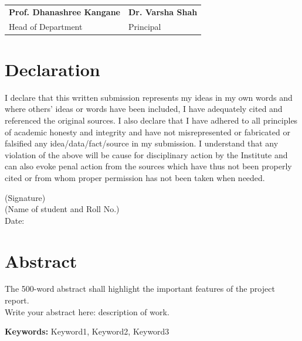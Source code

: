 \documentclass[12pt,a4paper,twoside,openright]{report}
\begin{document}
	\vspace{0.8cm}
	\begin{center}
		\begin{tabular}{p{} p{}}
			\textbf{Prof. Dhanashree Kangane} &
			\textbf{Dr. Varsha Shah} \\
			Head of Department & Principal
		\end{tabular}
	\end{center}
	\vspace*{\fill}
	\clearpage
	
	\chapter*{Declaration}
	I declare that this written submission represents my ideas in my own words and where others' ideas or words have been included, I have adequately cited and referenced the original sources. I also declare that I have adhered to all principles of academic honesty and integrity and have not misrepresented or fabricated or falsified any idea/data/fact/source in my submission. I understand that any violation of the above will be cause for disciplinary action by the Institute and can also evoke penal action from the sources which have thus not been properly cited or from whom proper permission has not been taken when needed.
	
	\vspace{1cm}
	\begin{flushright}
		(Signature) \\[0.5cm]
		(Name of student and Roll No.) \\
		Date:
	\end{flushright}
	
	\chapter*{Abstract}
	The 500-word abstract shall highlight the important features of the project report. \\
	Write your abstract here: description of work.
	
	\textbf{Keywords:} Keyword1, Keyword2, Keyword3
	
	\newpage
	\tableofcontents
	
	
	
	

	
	
	

	
	
	\printbibliography

	
	
\end{document}

